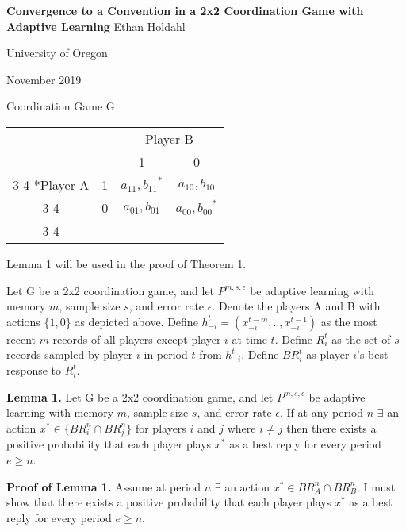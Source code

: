 \documentclass{article}
\begin{document}
\centering
\Large
\textbf{Convergence to a Convention in a 2x2 Coordination Game with Adaptive Learning}
\vskip0pt
Ethan Holdahl

\large
University of Oregon

November 2019

\vskip24pt

\centering
Coordination Game G
\vskip6pt
    \begin{tabular}{cc|c|c|}
      & \multicolumn{1}{c}{} & \multicolumn{2}{c}{Player B}\\
      & \multicolumn{1}{c}{} & \multicolumn{1}{c}{1}  & \multicolumn{1}{c}{0} \\\cline{3-4}
      \multirow{2}*{Player A}  & 1 & ${a_{11},b_{11}}^*$ & $a_{10},b_{10}$ \\\cline{3-4}
      & 0 & $a_{01},b_{01}$ & ${a_{00},b_{00}}^*$ \\\cline{3-4}
    \end{tabular}

\vskip24pt

\raggedright

Lemma 1 will be used in the proof of Theorem 1.

\vskip12pt
Let G be a 2x2 coordination game, and let $P^{m,s,\epsilon}$ be adaptive learning with memory $m$, sample size $s$, and error rate $\epsilon$.
Denote the players A and B with actions $\{1,0\}$ as depicted above. Define $h_{-i}^{t}=(x_{-i}^{t-m},..,x_{-i}^{t-1})$ as the most recent $m$ records of all players except player $i$ at time $t$. Define $R_i^{t}$ as the set of $s$ records sampled by player $i$ in period $t$ from $h_{-i}^{t}$. Define $BR_i^{t}$ as player $i$'s best response to $R_i^{t}$.

\vskip12pt

\textbf{Lemma 1.} Let G be a 2x2 coordination game, and let $P^{m,s,\epsilon}$ be adaptive learning with memory $m$, sample size $s$, and error rate $\epsilon$. If at any period $n$ $\exists$ an action $ x^* \in \{BR_i^{n} \cap BR_j^{n}\}$ for players $i$ and $j$ where $i \neq j$ then there exists a positive probability that each player plays $x^*$ as a best reply for every period $e \geq n$.

\vskip12pt

\textbf{Proof of Lemma 1.} Assume at period $n$ $\exists$ an action $ x^* \in BR_A^{n} \cap BR_B^{n}$. I must show that there exists a positive probability that each player plays $x^*$ as a best reply for every period $e \geq n$.

\vskip12pt
\end{document}
